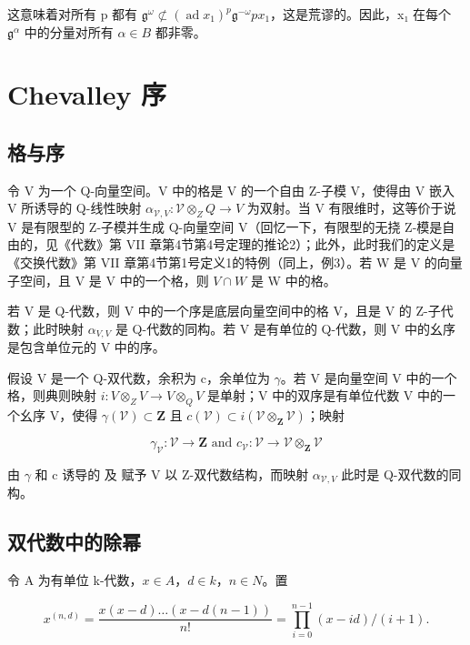 这意味着对所有 p 都有 \(\mathfrak{g}^{\omega} \not\subset (\operatorname{ad} x_1)^p \mathfrak{g}^{-\omega}\)\(p\)\(x_1\)，这是荒谬的。因此，x₁ 在每个 \(\mathfrak{g}^{\alpha}\) 中的分量对所有 \(\alpha \in B\) 都非零。

\section{Chevalley 序}

\subsection{格与序}

令 V 为一个 Q-向量空间。V 中的格是 V 的一个自由 Z-子模 V，使得由 V 嵌入 V 所诱导的 Q-线性映射 \(\alpha_{\mathcal{V},V} : \mathcal{V} \otimes_{Z} Q \to V\) 为双射。当 V 有限维时，这等价于说 V 是有限型的 Z-子模并生成 Q-向量空间 V（回忆一下，有限型的无挠 Z-模是自由的，见《代数》第 VII 章第4节第4号定理的推论2）；此外，此时我们的定义是《交换代数》第 VII 章第4节第1号定义1的特例（同上，例3）。若 W 是 V 的向量子空间，且 V 是 V 中的一个格，则 \(V \cap W\) 是 W 中的格。

若 V 是 Q-代数，则 V 中的一个序是底层向量空间中的格 V，且是 V 的 Z-子代数；此时映射 \(\alpha_{V,V}\) 是 Q-代数的同构。若 V 是有单位的 Q-代数，则 V 中的幺序是包含单位元的 V 中的序。

假设 V 是一个 Q-双代数，余积为 c，余单位为 \(\gamma\)。若 V 是向量空间 V 中的一个格，则典则映射 \(i: V \otimes_{Z} V \to V \otimes_{Q} V\) 是单射；V 中的双序是有单位代数 V 中的一个幺序 V，使得 \(\gamma(\mathcal{V}) \subset \mathbf{Z}\) 且 \(c(\mathcal{V}) \subset i(\mathcal{V} \otimes_{\mathbf{Z}} \mathcal{V})\)；映射

\[
\gamma_ {\mathcal {V}} \colon \mathcal {V} \to \mathbf {Z} \text { and } c _ {\mathcal {V}} \colon \mathcal {V} \to \mathcal {V} \otimes_ {\mathbf {Z}} \mathcal {V}
\]

由 \(\gamma\) 和 c 诱导的  及  赋予 V 以 Z-双代数结构，而映射 \(\alpha_{\mathcal{V},V}\) 此时是 Q-双代数的同构。

\subsection{双代数中的除幂}

令 A 为有单位 k-代数，\(x \in A\)，\(d \in k\)，\(n \in N\)。置

\[
x ^ {(n, d)} = \frac {x (x - d) \dots (x - d (n - 1))}{n !} = \prod_ {i = 0} ^ {n - 1} (x - i d) / (i + 1).\tag{1}
\]

